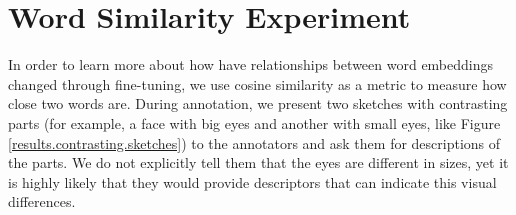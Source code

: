 \section{Word Similarity Experiment} \label{results.cosinesim}

In order to learn more about how have relationships between word embeddings changed through fine-tuning, we use cosine similarity as a metric to measure how close two words are. During annotation, we present two sketches with contrasting parts (for example, a face with big eyes and another with small eyes, like Figure \ref{results.contrasting.sketches}) to the annotators and ask them for descriptions of the parts. We do not explicitly tell them that the eyes are different in sizes, yet it is highly likely that they would provide descriptors that can indicate this visual differences.  


